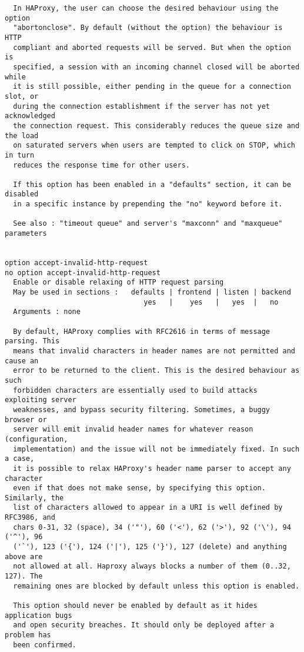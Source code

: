\begin{verbatim}
  In HAProxy, the user can choose the desired behaviour using the option
  "abortonclose". By default (without the option) the behaviour is HTTP
  compliant and aborted requests will be served. But when the option is
  specified, a session with an incoming channel closed will be aborted while
  it is still possible, either pending in the queue for a connection slot, or
  during the connection establishment if the server has not yet acknowledged
  the connection request. This considerably reduces the queue size and the load
  on saturated servers when users are tempted to click on STOP, which in turn
  reduces the response time for other users.

  If this option has been enabled in a "defaults" section, it can be disabled
  in a specific instance by prepending the "no" keyword before it.

  See also : "timeout queue" and server's "maxconn" and "maxqueue" parameters


option accept-invalid-http-request
no option accept-invalid-http-request
  Enable or disable relaxing of HTTP request parsing
  May be used in sections :   defaults | frontend | listen | backend
                                 yes   |    yes   |   yes  |   no
  Arguments : none

  By default, HAProxy complies with RFC2616 in terms of message parsing. This
  means that invalid characters in header names are not permitted and cause an
  error to be returned to the client. This is the desired behaviour as such
  forbidden characters are essentially used to build attacks exploiting server
  weaknesses, and bypass security filtering. Sometimes, a buggy browser or
  server will emit invalid header names for whatever reason (configuration,
  implementation) and the issue will not be immediately fixed. In such a case,
  it is possible to relax HAProxy's header name parser to accept any character
  even if that does not make sense, by specifying this option. Similarly, the
  list of characters allowed to appear in a URI is well defined by RFC3986, and
  chars 0-31, 32 (space), 34 ('"'), 60 ('<'), 62 ('>'), 92 ('\'), 94 ('^'), 96
  ('`'), 123 ('{'), 124 ('|'), 125 ('}'), 127 (delete) and anything above are
  not allowed at all. Haproxy always blocks a number of them (0..32, 127). The
  remaining ones are blocked by default unless this option is enabled.

  This option should never be enabled by default as it hides application bugs
  and open security breaches. It should only be deployed after a problem has
  been confirmed.


\end{verbatim}
